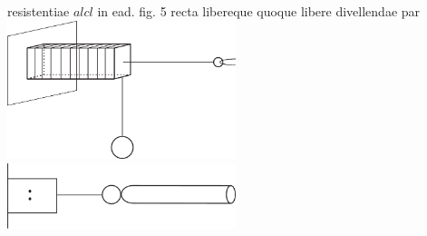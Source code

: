 resistentiae\protect{} $\displaystyle alcl$ in ead. fig. 5 recta libereque 
quoque libere divellendae par 
\pend
\vspace*{2.0em}%
\pstart
\centering%
\noindent%
\includegraphics[width=0.5\textwidth]{images/LH037,04_051-052d-7.pdf}\\
\vspace*{0.5em}
\noindent {}%
\pend
\vspace*{1.5em}%
\pstart%
\centering%
\noindent%
\includegraphics[width=0.5\textwidth]{images/LH037,04_051-052d-8.pdf}\\
\noindent {}%
\pend
\count{}
\count{}
\count{}
%
%
%
%
